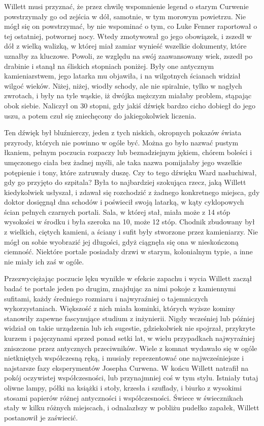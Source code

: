 Willett musi przyznać, że przez chwilę wspomnienie legend o starym Curwenie powstrzymały go od zejścia w dół, samotnie, w tym morowym powietrzu. Nie mógł się on powstrzymać, by nie wspominać o tym, co Luke Fenner raportował o tej ostatniej, potwornej nocy. Wtedy zmotywował go jego obowiązek, i zszedł w dół z wielką walizką, w której miał zamiar wynieść wszelkie dokumenty, które uznałby za kluczowe. Powoli, ze względu na swój zaawansowany wiek, zszedł po drabinie i stanął na śliskich stopniach poniżej. Były one antycznym kamieniarstwem, jego latarka mu objawiła, i na wilgotnych ścianach widział wilgoć wieków. Niżej, niżej, wiodły schody, ale nie spiralnie, tylko w nagłych zwrotach, i były na tyle wąskie, iż dwójka mężczyzn miałaby problem, stąpając obok siebie. Naliczył on 30 stopni, gdy jakiś dźwięk bardzo cicho dobiegł do jego uszu, a potem czuł się zniechęcony do jakiegokolwiek liczenia. 

Ten dźwięk był bluźnierczy, jeden z tych niskich, okropnych pokazów świata przyrody, których nie powinno w ogóle być. Można go było nazwać pustym łkaniem, pełnym poczucia rozpaczy lub beznadziejnym jękiem, chórem boleści i umęczonego ciała bez żadnej myśli, ale taka nazwa pomijałaby jego wszelkie potępienie i tony, które zatruwały duszę. Czy to tego dźwięku Ward nasłuchiwał, gdy go przyjęto do szpitala? Była to najbardziej szokująca rzecz, jaką Willett kiedykolwiek usłyszał, i zdawał się rozchodzić z żadnego konkretnego miejsca, gdy doktor dosięgnął dna schodów i poświecił swoją latarką, w kąty cyklopowych ścian pełnych czarnych portali. Sala, w której stał, miała może z 14 stóp wysokości w środku i była szeroka na 10, może 12 stóp. Chodnik zbudowany był z wielkich, ciętych kamieni, a ściany i sufit były stworzone przez kamieniarzy. Nie mógł on sobie wyobrazić jej długości, gdyż ciągnęła się ona w nieskończoną ciemność. Niektóre portale posiadały drzwi w starym, kolonialnym typie, a inne nie miały ich zaś w ogóle.

Przezwyciężając poczucie lęku wynikłe w efekcie zapachu i wycia Willett zaczął badać te portale jeden po drugim, znajdując za nimi pokoje z kamiennymi sufitami, każdy średniego rozmiaru i najwyraźniej o tajemniczych wykorzystaniach. Większość z nich miała kominki, których wyższe kominy stanowiły zapewne fascynujące studium z inżynierii. Nigdy wcześniej lub później widział on takie urządzenia lub ich sugestie, gdziekolwiek nie spojrzał, przykryte kurzem i pajęczynami sprzed  ponad setki lat, w wielu przypadkach najwyraźniej zniszczone przez antycznych przeciwników. Wiele z komnat wydawało się w ogóle nietkniętych współczesną ręką, i musiały reprezentować one najwcześniejsze i najstarsze fazy eksperymentów Josepha Curwena. W końcu Willett natrafił na pokój oczywistej współczesności, lub przynajmniej coś w tym stylu. Istniały tutaj oliwne lampy, półki na książki i stoły, krzesła i szuflady, i biurko z wysokimi stosami papierów różnej antyczności i współczesności. Świece w świecznikach stały w kilku różnych miejscach, i odnalazłszy w pobliżu pudełko zapałek, Willett postanowił je zaświecić. 

